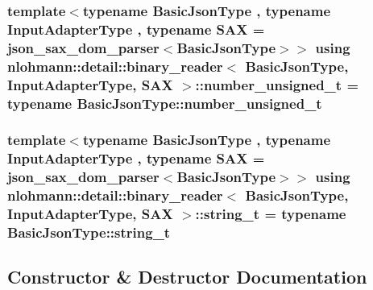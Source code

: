 \subsubsection[{\texorpdfstring{number\+\_\+unsigned\+\_\+t}{number_unsigned_t}}]{\setlength{\rightskip}{0pt plus 5cm}template$<$typename Basic\+Json\+Type , typename Input\+Adapter\+Type , typename S\+AX  = json\+\_\+sax\+\_\+dom\+\_\+parser$<$\+Basic\+Json\+Type$>$$>$ using {\bf nlohmann\+::detail\+::binary\+\_\+reader}$<$ Basic\+Json\+Type, Input\+Adapter\+Type, S\+AX $>$\+::{\bf number\+\_\+unsigned\+\_\+t} =  typename Basic\+Json\+Type\+::number\+\_\+unsigned\+\_\+t\hspace{0.3cm}{\ttfamily [private]}}\hypertarget{classnlohmann_1_1detail_1_1binary__reader_a02a70f424099428d9a69606b7fb7074a}{}\label{classnlohmann_1_1detail_1_1binary__reader_a02a70f424099428d9a69606b7fb7074a}
\subsubsection[{\texorpdfstring{string\+\_\+t}{string_t}}]{\setlength{\rightskip}{0pt plus 5cm}template$<$typename Basic\+Json\+Type , typename Input\+Adapter\+Type , typename S\+AX  = json\+\_\+sax\+\_\+dom\+\_\+parser$<$\+Basic\+Json\+Type$>$$>$ using {\bf nlohmann\+::detail\+::binary\+\_\+reader}$<$ Basic\+Json\+Type, Input\+Adapter\+Type, S\+AX $>$\+::{\bf string\+\_\+t} =  typename Basic\+Json\+Type\+::string\+\_\+t\hspace{0.3cm}{\ttfamily [private]}}\hypertarget{classnlohmann_1_1detail_1_1binary__reader_a823c244e5dbf1a8edae40819f9434237}{}\label{classnlohmann_1_1detail_1_1binary__reader_a823c244e5dbf1a8edae40819f9434237}


\subsection{Constructor \& Destructor Documentation}
